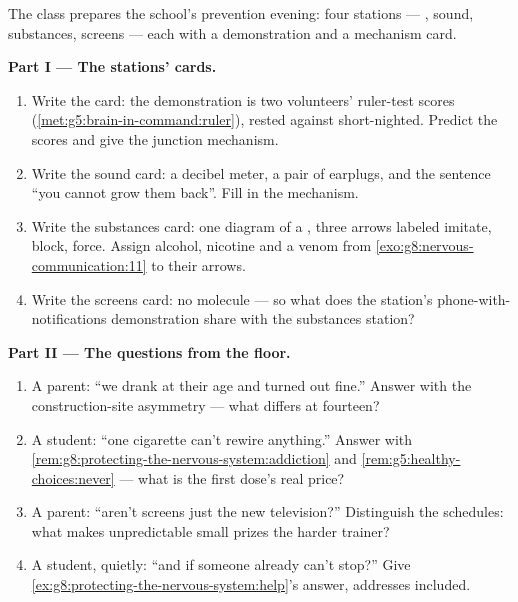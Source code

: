 \begin{problem}\label{pb:g8:protecting-the-nervous-system:1}
The class prepares the school's prevention evening: four
stations --- , sound, substances, screens --- each
with a demonstration and a mechanism card.

\medskip\noindent\textbf{Part I --- The stations'
cards.}
\begin{enumerate}
  \item Write the  card: the demonstration is two
        volunteers' ruler-test scores
        (\cref{met:g5:brain-in-command:ruler}), rested
        against short-nighted. Predict the scores and
        give the junction mechanism.
  \item Write the sound card: a decibel meter, a pair of
        earplugs, and the sentence ``you cannot grow
        them back''. Fill in the mechanism.
  \item Write the substances card: one diagram of a
        , three arrows labeled imitate, block,
        force. Assign alcohol, nicotine and a venom from
        \cref{exo:g8:nervous-communication:11} to their
        arrows.
  \item Write the screens card: no molecule --- so what
        does the station's phone-with-notifications
        demonstration share with the substances
        station?
\end{enumerate}

\medskip\noindent\textbf{Part II --- The questions from
the floor.}
\begin{enumerate}[resume]
  \item A parent: ``we drank at their age and turned
        out fine.'' Answer with the construction-site
        asymmetry --- what differs at fourteen?
  \item A student: ``one cigarette can't rewire
        anything.'' Answer with
        \cref{rem:g8:protecting-the-nervous-system:addiction}
        and \cref{rem:g5:healthy-choices:never} --- what
        is the first dose's real price?
  \item A parent: ``aren't screens just the new
        television?'' Distinguish the schedules: what
        makes unpredictable small prizes the harder
        trainer?
  \item A student, quietly: ``and if someone already
        can't stop?'' Give
        \cref{ex:g8:protecting-the-nervous-system:help}'s
        answer, addresses included.
\end{enumerate}


\end{problem}
